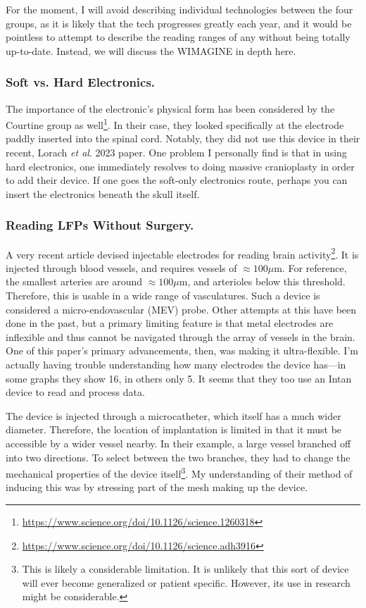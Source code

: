 \documentclass[12pt]{report}
\begin{document}
For the moment, I will avoid describing individual technologies between the four groups, as it is likely that the tech progresses greatly each year, and it would be pointless to attempt to describe the reading ranges of any without being totally up-to-date. Instead, we will discuss the WIMAGINE in depth here.

\subsubsection{Soft vs. Hard Electronics.}
The importance of the electronic's physical form has been considered by the Courtine group as well\footnote{\url{https://www.science.org/doi/10.1126/science.1260318}}. In their case, they looked specifically at the electrode paddly inserted into the spinal cord. Notably, they did not use this device in their recent, Lorach \textit{et al}. 2023 paper. One problem I personally find is that in using hard electronics, one immediately resolves to doing massive cranioplasty in order to add their device. If one goes the soft-only electronics route, perhaps you can insert the electronics beneath the skull itself. 

\subsubsection{Reading LFPs Without Surgery.}

A very recent article devised injectable electrodes for reading brain activity\footnote{\url{https://www.science.org/doi/10.1126/science.adh3916}}. It is injected through blood vessels, and requires vessels of $\approx 100 \mu$m. For reference, the smallest arteries are around $\approx 100 \mu$m, and arterioles below this threshold. Therefore, this is usable in a wide range of vasculatures. Such a device is considered a micro-endovascular (MEV) probe. Other attempts at this have been done in the past, but a primary limiting feature is that metal electrodes are inflexible and thus cannot be navigated through the array of vessels in the brain. One of this paper's primary advancements, then, was making it ultra-flexible. I'm actually having trouble understanding how many electrodes the device has---in some graphs they show 16, in others only 5. It seems that they too use an Intan device to read and process data.\newline

The device is injected through a microcatheter, which itself has a much wider diameter. Therefore, the location of implantation is limited in that it must be accessible by a wider vessel nearby. In their example, a large vessel branched off into two directions. To select between the two branches, they had to change the mechanical properties of the device itself\footnote{This is likely a considerable limitation. It is unlikely that this sort of device will ever become generalized or patient specific. However, its use in research might be considerable.}. My understanding of their method of inducing this was by stressing part of the mesh making up the device.\newline
\end{document}
